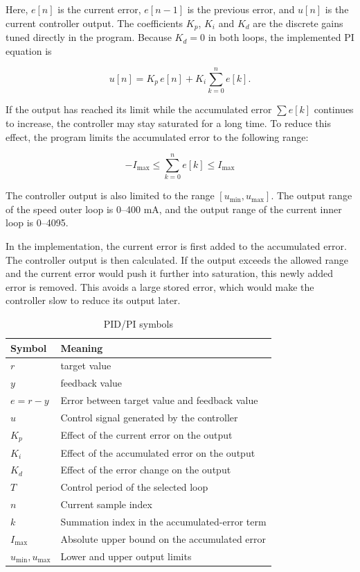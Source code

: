 \documentclass[12pt, a4paper]{report}
\begin{document}
Here, \(e[n]\) is the current error, \(e[n-1]\) is the previous error, and \(u[n]\) is the current controller output. The coefficients \(K_p\), \(K_i\) and \(K_d\) are the discrete gains tuned directly in the program. Because \(K_d=0\) in both loops, the implemented PI equation is

\begin{equation}
u[n] = K_p\,e[n] + K_i \sum_{k=0}^{n} e[k].
\label{eq:pi_discrete}
\end{equation}

If the output has reached its limit while the accumulated error \(\sum e[k]\) continues to increase, the controller may stay saturated for a long time. To reduce this effect, the program limits the accumulated error to the following range:

\[
-I_{\max}
\leq \sum_{k=0}^{n} e[k]
\leq I_{\max}
\]

The controller output is also limited to the range \([u_{\min},u_{\max}]\). The output range of the speed outer loop is 0--400 mA, and the output range of the current inner loop is 0--4095.

In the implementation, the current error is first added to the accumulated error. The controller output is then calculated. If the output exceeds the allowed range and the current error would push it further into saturation, this newly added error is removed. This avoids a large stored error, which would make the controller slow to reduce its output later.
\begin{table}[H]
\centering
\caption{PID/PI symbols}
\small
\begin{tabular}{@{}p{}p{}@{}}
\toprule
Symbol & Meaning \\
\midrule
\(r\) & target value \\
\(y\) & feedback value \\
\(e=r-y\) & Error between target value and feedback value \\
\(u\) & Control signal generated by the controller \\
\(K_p\) & Effect of the current error on the output \\
\(K_i\) & Effect of the accumulated error on the output \\
\(K_d\) & Effect of the error change on the output \\
\(T\) & Control period of the selected loop \\
\(n\) & Current sample index \\
\(k\) & Summation index in the accumulated-error term \\
\(I_{\max}\) & Absolute upper bound on the accumulated error \\
\(u_{\min}, u_{\max}\) & Lower and upper output limits \\
\bottomrule
\end{tabular}
\end{table}
\end{document}
